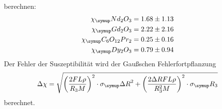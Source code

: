 berechnen:
\begin{align*}
  \chi_\su{Nd_2O_3}       &= 1.68 \pm 1.13 \\
  \chi_\su{Gd_2O_3}       &= 2.22 \pm 2.16 \\
  \chi_\su{C_6O_{12}Pr_2} &= 0.25 \pm 0.16 \\
  \chi_\su{Dy_2O_3}       &= 0.79 \pm 0.94 %
\end{align*}
Der Fehler der Suszeptibilität wird der Gaußschen Fehlerfortpflanzung
\begin{equation*}
  \Delta\chi = \sqrt{\left(\frac{2FL\rho}{R_3M}\right)^2\cdot\sigma_\su{\Delta R}^2
  + \left(\frac{2\Delta R FL\rho}{R_3^2M}\right)^2\cdot\sigma_\su{R_3}}
\end{equation*}
berechnet.
